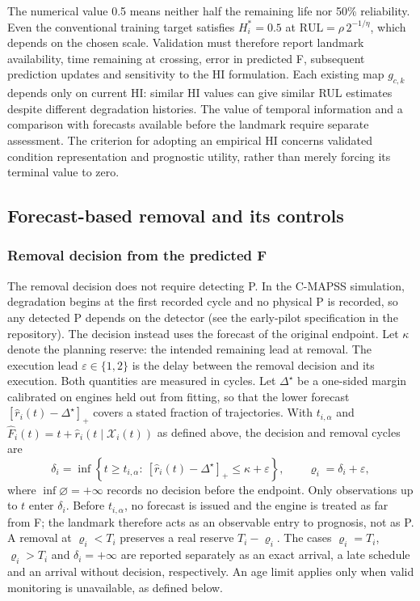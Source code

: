 \documentclass[preprint,12pt]{elsarticle}
\newcommand{\RUL}{\mathrm{RUL}}
\begin{document}
The numerical value 0.5 means neither half the remaining life nor 50\% reliability. Even the conventional training target satisfies $H_i^*=0.5$ at $\RUL=\rho\,2^{-1/\eta}$, which depends on the chosen scale. Validation must therefore report landmark availability, time remaining at crossing, error in predicted F, subsequent prediction updates and sensitivity to the HI formulation. Each existing map $g_{c,k}$ depends only on current HI: similar HI values can give similar RUL estimates despite different degradation histories. The value of temporal information and a comparison with forecasts available before the landmark require separate assessment. The criterion for adopting an empirical HI concerns validated condition representation and prognostic utility, rather than merely forcing its terminal value to zero.

\subsection{Forecast-based removal and its controls}\label{sec:removal}


\subsubsection{Removal decision from the predicted F}

The removal decision does not require detecting P. In the C-MAPSS simulation, degradation begins at the first recorded cycle and no physical P is recorded, so any detected P depends on the detector (see the early-pilot specification in the repository). The decision instead uses the forecast of the original endpoint. Let $\kappa$ denote the planning reserve: the intended remaining lead at removal. The execution lead $\varepsilon\in\{1,2\}$ is the delay between the removal decision and its execution. Both quantities are measured in cycles. Let $\Delta^{\star}$ be a one-sided margin calibrated on engines held out from fitting, so that the lower forecast $[\widehat r_i(t)-\Delta^{\star}]_+$ covers a stated fraction of trajectories. With $t_{i,\alpha}$ and $\widehat F_i(t)=t+\widehat r_i(t\mid\mathcal X_i(t))$ as defined above, the decision and removal cycles are
\[
\delta_i=\inf\left\{t\geq t_{i,\alpha}:\ [\widehat r_i(t)-\Delta^{\star}]_+\leq\kappa+\varepsilon\right\},
\qquad
\varrho_i=\delta_i+\varepsilon,
\]
where $\inf\varnothing=+\infty$ records no decision before the endpoint. Only observations up to $t$ enter $\delta_i$. Before $t_{i,\alpha}$, no forecast is issued and the engine is treated as far from F; the landmark therefore acts as an observable entry to prognosis, not as P. A removal at $\varrho_i<T_i$ preserves a real reserve $T_i-\varrho_i$. The cases $\varrho_i=T_i$, $\varrho_i>T_i$ and $\delta_i=+\infty$ are reported separately as an exact arrival, a late schedule and an arrival without decision, respectively. An age limit applies only when valid monitoring is unavailable, as defined below.
\end{document}
